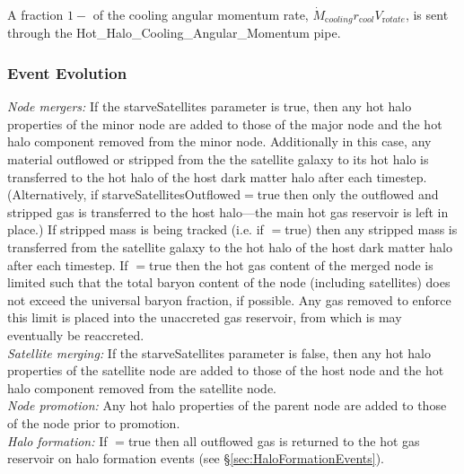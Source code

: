 A fraction $1-${\normalfont \ttfamily [hotHaloAngularMomentumLossFraction]} of the cooling angular momentum rate, $\dot{M}_{\mathrm cooling} r_{\mathrm cool} V_{\mathrm rotate}$, is sent through the {\normalfont \ttfamily Hot\_Halo\_Cooling\_Angular\_Momentum} pipe.

\subsubsection{Event Evolution}

\noindent\emph{Node mergers:} If the {\normalfont \ttfamily starveSatellites} parameter is true, then any hot halo properties of the minor \gls{node} are added to those of the major \gls{node} and the hot halo \gls{component} removed from the minor node. Additionally in this case, any material outflowed or stripped from the the satellite galaxy to its hot halo is transferred to the hot halo of the host dark matter halo after each timestep. (Alternatively, if {\normalfont \ttfamily starveSatellitesOutflowed}$=${\normalfont \ttfamily true} then only the outflowed and stripped gas is transferred to the host halo---the main hot gas reservoir is left in place.) If stripped mass is being tracked (i.e. if {\normalfont \ttfamily [hotHaloTrackStrippedGas]}$=${\normalfont \ttfamily true}) then any stripped mass is transferred from the satellite galaxy to the hot halo of the host dark matter halo after each timestep. If {\normalfont \ttfamily [hotHaloNodeMergerLimitBaryonFraction]}$=${\normalfont \ttfamily true} then the hot gas content of the merged node is limited such that the total baryon content of the node (including satellites) does not exceed the universal baryon fraction, if possible. Any gas removed to enforce this limit is placed into the unaccreted gas reservoir, from which is may eventually be reaccreted.\\

\noindent\emph{Satellite merging:} If the {\normalfont \ttfamily starveSatellites} parameter is false, then any hot halo properties of the satellite \gls{node} are added to those of the host \gls{node} and the hot halo \gls{component} removed from the satellite node.\\

\noindent\emph{Node promotion:} Any hot halo properties of the parent \gls{node} are added to those of the \gls{node} prior to promotion.\\

\noindent\emph{Halo formation:} If {\normalfont \ttfamily [hotHaloOutflowReturnOnFormation]}$=${\normalfont \ttfamily true} then all outflowed gas is returned to the hot gas reservoir on halo formation events (see \S\ref{sec:HaloFormationEvents}).\\

